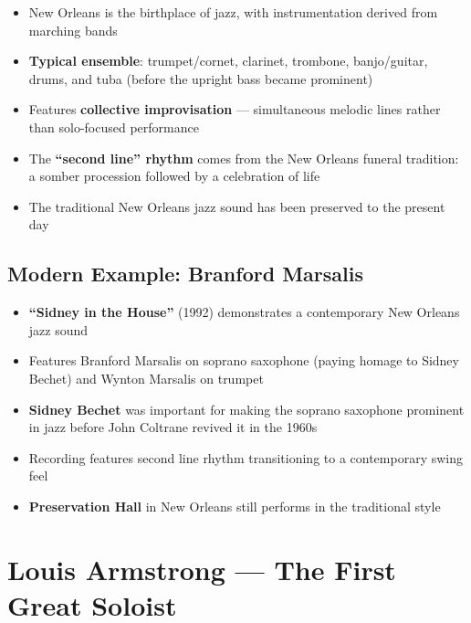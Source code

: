 \documentclass[11pt, letterpaper]{article}
\begin{document}
\begin{itemize}
    \item New Orleans is the birthplace of jazz, with instrumentation derived from marching bands
    \item \textbf{Typical ensemble}: trumpet/cornet, clarinet, trombone, banjo/guitar, drums, and tuba (before the upright bass became prominent)
    \item Features \textbf{collective improvisation} --- simultaneous melodic lines rather than solo-focused performance
    \item The \textbf{``second line'' rhythm} comes from the New Orleans funeral tradition: a somber procession followed by a celebration of life
    \item The traditional New Orleans jazz sound has been preserved to the present day
\end{itemize}

\subsection{Modern Example: Branford Marsalis}
\begin{itemize}
    \item \textbf{``Sidney in the House''} (1992) demonstrates a contemporary New Orleans jazz sound
    \item Features Branford Marsalis on soprano saxophone (paying homage to Sidney Bechet) and Wynton Marsalis on trumpet
    \item \textbf{Sidney Bechet} was important for making the soprano saxophone prominent in jazz before John Coltrane revived it in the 1960s
    \item Recording features second line rhythm transitioning to a contemporary swing feel
    \item \textbf{Preservation Hall} in New Orleans still performs in the traditional style
\end{itemize}

\section{Louis Armstrong --- The First Great Soloist}
\end{document}
